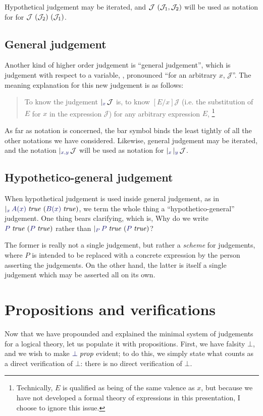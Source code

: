 Hypothetical judgement may be iterated, and
$\mathcal{J}\ (\mathcal{J}_1,\mathcal{J}_2)$ will be used as notation for
for $\mathcal{J}\ (\mathcal{J}_2)\ (\mathcal{J}_1)$.

\subsection{General judgement}

Another kind of higher order judgement is ``general judgement'', which
is judgement with respect to a variable,
, pronounced ``for an arbitrary $x$,
$\mathcal{J}$''. The meaning explanation for this new judgement is as
follows:

\begin{quote}
  To know the judgement $\genj{x}{\mathcal{J}}$ is, to know
$[E/x]\mathcal{J}$ (i.e. the substitution of $E$ for $x$ in the
expression $\mathcal{J}$) for any arbitrary expression $E$,
\footnote{Technically, $E$ is qualified as being of the same valence
as $x$, but because we have not developed a formal theory of
expressions in this presentation, I choose to ignore this issue.}
\end{quote}

As far as notation is concerned, the bar symbol binds the least
tightly of all the other notations we have considered. Likewise,
general judgement may be iterated, and the notation
$\genj{x,y}{\mathcal{J}}$ will be used as notation for
$\genj{x}{\genj{y}{\mathcal{J}}}$.

\subsection{Hypothetico-general judgement}

When hypothetical judgement is used inside general judgement, as in
$\genj{x}{\hyp{\istrue{A(x)}}{\istrue{B(x)}}}$, we term the whole
thing a ``hypothetico-general'' judgement. One thing bears clarifying,
which is, Why do we write $\hyp{\istrue{P}}{\istrue{P}}$ rather than
$\genj{P}{\hyp{\istrue{P}}{\istrue{P}}}$?

The former is really not a single judgement, but rather a
\emph{scheme} for judgements, where $P$ is intended to be replaced
with a concrete expression by the person asserting the judgements. On
the other hand, the latter is itself a single judgement which may be
asserted all on its own.

\section{Propositions and verifications}
Now that we have propounded and explained the minimal system of judgements for
a logical theory, let us populate it with propositions. First, we have falsity
$\bot$, and we wish to make $\isprop{\bot}$ evident; to do this, we simply state
what counts as a direct verification of $\bot$: there is no
direct verification of $\bot$.

